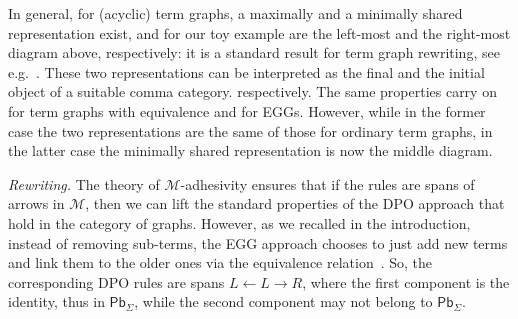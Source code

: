 \documentclass[3p]{elsarticle}
\newcommand{\pbc}{\mathsf{Pb}}
\newcommand{\eg}[0]{\mathbf{EGG}}
\newcommand{\catname}[1]{\textbf{\textup{#1}}}
\newcommand{\GEqTGs}{\catname{GEqTG}_{\Sigma}}
\newcommand{\tg}[0]{\catname{TG}_{\Sigma}}
\theoremstyle{remark}
\theoremstyle{definition}
\begin{document}
In general, for (acyclic) term graphs, a maximally and a minimally shared representation
exist, and for our toy example are the left-most and the right-most diagram above, respectively:
it is a standard result for term graph rewriting, see e.g.~\cite{AriolaKP00}. 
These two representations can be interpreted as the final and the initial object of a suitable comma category.
respectively.
%
The same properties carry on 
%
for term graphs with equivalence and for EGGs. However, while in the former case the
two representations are the same of those for ordinary term graphs, in the latter case
the minimally shared representation is now the middle diagram.
%


\emph{Rewriting.} The theory of $\mathcal{M}$-adhesivity ensures that if the rules are spans of 
arrows in $\mathcal{M}$, then we can lift the standard properties
of the DPO approach that hold in the category of graphs.
However, as we recalled in the introduction, instead of removing sub-terms, the EGG approach 
chooses to
just add new terms and link them to the older ones via the equivalence relation~\cite{DetlefsNS05}.
So, the corresponding DPO rules 
are spans $L \leftarrow L \rightarrow R$, where the first component is the identity, thus in $\pbc_\Sigma$,
while the second component may not belong to $\pbc_\Sigma$. 
\end{document}
